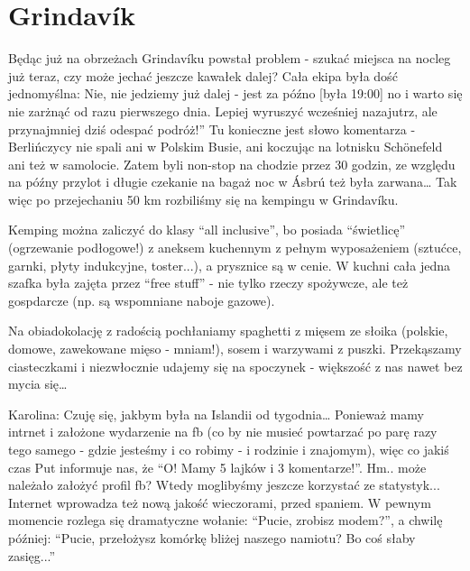 \section{Grindavík}

Będąc już na obrzeżach Grindavíku powstał problem - szukać miejsca na nocleg już teraz, czy może jechać jeszcze kawałek dalej? Cała ekipa była dość jednomyślna: Nie, nie jedziemy już dalej - jest za późno [była 19:00] no i warto się nie zarżnąć od razu pierwszego dnia. Lepiej wyruszyć wcześniej nazajutrz, ale przynajmniej dziś odespać podróż!” Tu konieczne jest słowo komentarza - Berlińczycy nie spali ani w Polskim Busie, ani koczując na lotnisku Schönefeld ani też w samolocie. Zatem byli non-stop na chodzie przez 30 godzin, ze względu na późny przylot i długie czekanie na bagaż noc w Ásbrú też była zarwana… Tak więc po przejechaniu 50 km rozbiliśmy się na kempingu w Grindavíku.

Kemping można zaliczyć do klasy “all inclusive”, bo posiada “świetlicę” (ogrzewanie podłogowe!) z aneksem kuchennym z pełnym wyposażeniem (sztućce, garnki, płyty indukcyjne, toster...), a prysznice są w cenie. W kuchni cała jedna szafka była zajęta przez “free stuff” - nie tylko rzeczy spożywcze, ale też gospdarcze (np. są wspomniane naboje gazowe).



Na obiadokolację z radością pochłaniamy spaghetti z mięsem ze słoika (polskie, domowe, zawekowane mięso - mniam!), sosem i warzywami z puszki. Przekąszamy ciasteczkami i niezwłocznie udajemy się na spoczynek - większość z nas nawet bez mycia się…


Karolina: Czuję się, jakbym była na Islandii od tygodnia…
Ponieważ mamy intrnet i założone wydarzenie na fb (co by nie musieć powtarzać po parę razy tego samego - gdzie jesteśmy i co robimy - i rodzinie i znajomym), więc co jakiś czas Put informuje nas, że “O! Mamy 5 lajków i 3 komentarze!”. Hm.. może należało założyć profil fb? Wtedy moglibyśmy jeszcze korzystać ze statystyk...
Internet wprowadza też nową jakość wieczorami, przed spaniem. W pewnym momencie rozlega się dramatyczne wołanie: “Pucie, zrobisz modem?”, a chwilę później: “Pucie, przełożysz komórkę bliżej naszego namiotu? Bo coś słaby zasięg...”
